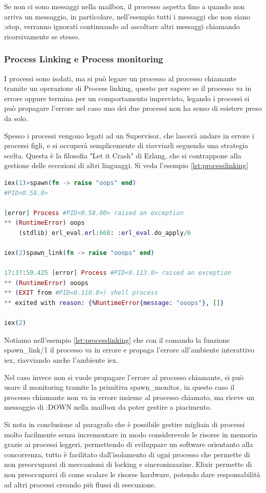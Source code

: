 Se non ci sono messaggi nella mailbox, il processo aspetta fino a
quando non arriva un messaggio, in particolare, 
nell'esempio tutti i messaggi che
non siano :stop, verranno ignorati continuando ad ascoltare altri
messaggi chiamando ricorsivamente se stesso.

\subsubsection{Process Linking e Process monitoring}

I processi sono isolati, ma si può legare un processo
al processo chiamante tramite un operazione di Process linking,
questo per sapere se il processo va in errore
oppure termina per un comportamento imprevisto,
legando i processi si può propagare l'errore nel caso
uno dei due processi non ha senso di esistere preso da solo.

Spesso i processi vengono legati ad un Supervisor, che
lascerà andare in errore i processi figli, e si occuperà
semplicemente di riavviarli seguendo una strategia scelta.
Questa è la filosofia "Let it Crash"
di Erlang, che si contrappone alla gestione delle eccezioni
di altri linguaggi. Si veda l'esempio \ref{lst:processlinking}

\begin{lstlisting}[language=elixir, caption={Process linking},captionpos=b,
	label={lst:processlinking}]
iex(1)>spawn(fn -> raise "oops" end)
#PID<0.58.0>
	
[error] Process #PID<0.58.00> raised an exception
** (RuntimeError) oops
	(stdlib) erl_eval.erl:668: :erl_eval.do_apply/6

iex(2)spawn_link(fn -> raise "ooops" end)

17:37:50.425 [error] Process #PID<0.113.0> raised an exception
** (RuntimeError) ooops
** (EXIT from #PID<0.110.0>) shell process 
** exited with reason: {%RuntimeError{message: "ooops"}, []}

iex(2)
\end{lstlisting}

Notiamo nell'esempio \ref{lst:processlinking} che con il comando
la funzione spawn\_link/1 il processo va in errore e propaga
l'errore all'ambiente interattivo iex, riavviando anche
l'ambiente iex.

Nel caso invece non si vuole propagare l'errore al processo
chiamante, si può usare il monitoring tramite la primitiva
spawn\_monitor, in questo caso il processo chiamante
non va in errore insieme al processo chiamato, ma riceve
un messaggio di :DOWN nella mailbox da poter gestire a piacimento.

Si nota in conclusione al paragrafo che è possibile
gestire migliaia di processi molto facilmente senza
incrementare in modo considerevole le risorse in memoria grazie
ai processi leggeri, permettendo
di sviluppare un software orientanto alla concorrenza,
tutto è facilitato dall'isolamento di ogni processo che 
permette di non preoccuparsi di meccanismi di locking e sincronizzazine.
Elixir permette di non preoccuparci di come scalare
le risorse hardware, potendo dare responsabilità ad altri
processi creando più flussi di esecuzione.